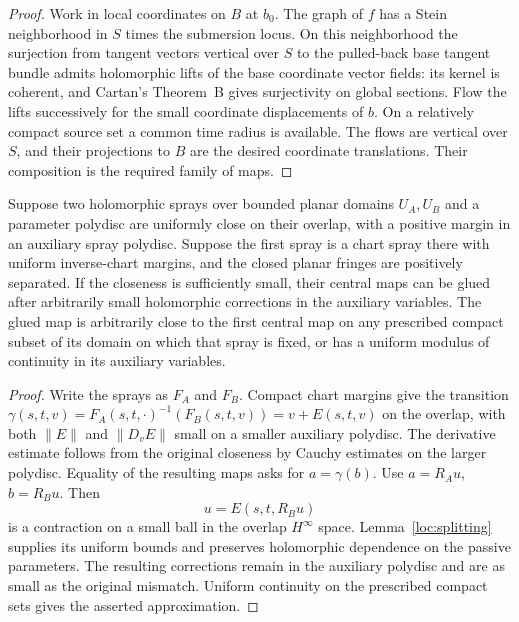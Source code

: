 \begin{proof}
Work in local coordinates on $B$ at $b_0$. The graph of $f$ has
a Stein neighborhood in $S$ times the submersion locus. On this
neighborhood the surjection from tangent vectors vertical over $S$
to the pulled-back base tangent bundle admits holomorphic lifts of
the base coordinate vector fields: its kernel is coherent, and
Cartan's Theorem~B gives surjectivity on global sections. Flow the
lifts successively for the small coordinate displacements of $b$.
On a relatively compact source set a common time radius is
available. The flows are vertical over $S$, and their projections
to $B$ are the desired coordinate translations. Their composition
is the required family of maps.
\end{proof}

\begin{lemma}\label{loc:gluing}
Suppose two holomorphic sprays over bounded planar domains $U_A,U_B$ and
a parameter polydisc are uniformly close on their overlap, with
a positive margin in an auxiliary spray polydisc. Suppose the
first spray is a chart spray there with uniform inverse-chart
margins, and the closed planar fringes
are positively separated. If the closeness is sufficiently small,
their central maps can be glued after arbitrarily small
holomorphic corrections in the auxiliary variables. The glued
map is arbitrarily close to the first central map on any prescribed
compact subset of its domain on which that spray is fixed, or has
a uniform modulus of continuity in its auxiliary variables.
\end{lemma}

\begin{proof}
Write the sprays as $F_A$ and $F_B$. Compact chart margins give
the transition
$\gamma(s,t,v)=F_A(s,t,\cdot)^{-1}(F_B(s,t,v))
=v+E(s,t,v)$ on the overlap, with both
$\|E\|$ and $\|D_vE\|$ small on a smaller auxiliary polydisc.
The derivative estimate follows from the original closeness by
Cauchy estimates on the larger polydisc. Equality of the resulting
maps asks for $a=\gamma(b)$.
Use $a=R_Au$, $b=R_Bu$. Then
\[
u=E(s,t,R_Bu)
\]
is a contraction on a small ball in the overlap $H^\infty$ space.
Lemma~\ref{loc:splitting} supplies its uniform bounds and preserves
holomorphic dependence on the passive parameters. The resulting
corrections remain in the auxiliary polydisc and are as small
as the original mismatch. Uniform continuity on the prescribed
compact sets gives the asserted approximation.
\end{proof}

